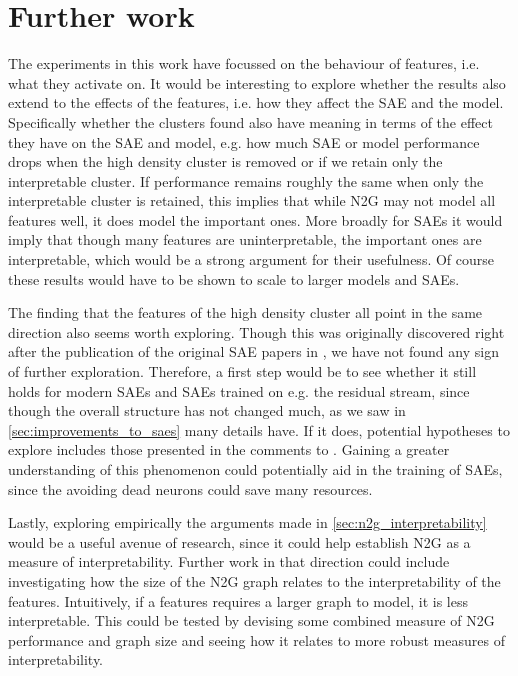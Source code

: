 \section{Further work}
The experiments in this work have focussed on the behaviour of features, i.e. what they activate on.
It would be interesting to explore whether the results also extend to the effects of the features, i.e. how they affect the SAE and the model.
Specifically whether the clusters found also have meaning in terms of the effect they have on the SAE and model, e.g. how much SAE or model performance drops when the high density cluster is removed or if we retain only the interpretable cluster.
If performance remains roughly the same when only the interpretable cluster is retained, this implies that while N2G may not model all features well, it does model the important ones.
More broadly for SAEs it would imply that though many features are uninterpretable, the important ones are interpretable, which would be a strong argument for their usefulness.
Of course these results would have to be shown to scale to larger models and SAEs.

The finding that the features of the high density cluster all point in the same direction also seems worth exploring.
Though this was originally discovered right after the publication of the original SAE papers in \textcite{nanda_open_2023}, we have not found any sign of further exploration.
Therefore, a first step would be to see whether it still holds for modern SAEs and SAEs trained on e.g. the residual stream, since though the overall structure has not changed much, as we saw in \autoref{sec:improvements_to_saes} many details have.
If it does, potential hypotheses to explore includes those presented in the comments to \textcite{nanda_open_2023}.
Gaining a greater understanding of this phenomenon could potentially aid in the training of SAEs, since the avoiding dead neurons could save many resources.

Lastly, exploring empirically the arguments made in \autoref{sec:n2g_interpretability} would be a useful avenue of research, since it could help establish N2G as a measure of interpretability.
Further work in that direction could include investigating how the size of the N2G graph relates to the interpretability of the features.
Intuitively, if a features requires a larger graph to model, it is less interpretable.
This could be tested by devising some combined measure of N2G performance and graph size and seeing how it relates to more robust measures of interpretability.
